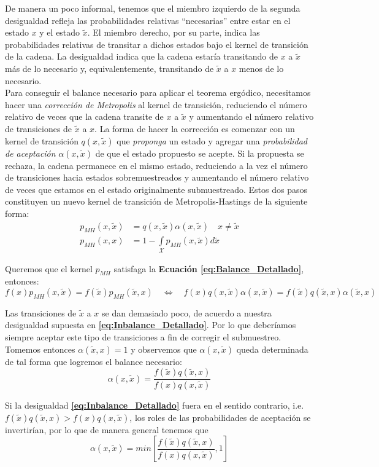 De manera un poco informal, tenemos que el miembro izquierdo de la segunda desigualdad refleja las probabilidades relativas ``necesarias'' entre estar en el estado $x$ y el estado $\tilde{x}$. El miembro derecho, por su parte, indica las probabilidades relativas de transitar a dichos estados bajo el kernel de transición de la cadena. La desigualdad indica que la cadena estaría transitando de $x$ a $\tilde{x}$ más de lo necesario y, equivalentemente, transitando de $\tilde{x}$ a $x$ menos de lo necesario.\\ 

Para conseguir el balance necesario para aplicar el teorema ergódico, necesitamos hacer una \textit{corrección de Metropolis} al kernel de transición, reduciendo el número relativo de veces que la cadena transite de $x$ a $\tilde{x}$ y aumentando el número relativo de transiciones de $\tilde{x}$ a $x$. La forma de hacer la corrección es comenzar con un kernel de transición $q(x,\tilde{x})$ que \textit{proponga} un estado y agregar una \textit{probabilidad de aceptación} $\alpha(x,\tilde{x})$ de que el estado propuesto se acepte. Si la propuesta se rechaza, la cadena permanece en el mismo estado, reduciendo a la vez el número de transiciones hacia estados sobremuestreados y aumentando el número relativo de veces que estamos en el estado originalmente submuestreado. Estos dos pasos constituyen un nuevo kernel de transición de Metropolis-Hastings de la siguiente forma: 
\begin{align*}
p_{MH}(x,\tilde{x}) &= q(x,\tilde{x})\alpha(x,\tilde{x}) \quad x \neq \tilde{x} \\
p_{MH}(x,x) &= 1 - \int\limits_\mathcal{X} p_{MH}(x,\tilde{x})d\tilde{x}
\end{align*}

Queremos que el kernel $p_{MH}$ satisfaga la \textbf{Ecuación \ref{eq:Balance_Detallado}}, entonces:
\begin{equation*}
f(x)p_{MH}(x,\tilde{x})=f(\tilde{x})p_{MH}(\tilde{x},x) \quad \Leftrightarrow \quad f(x)q(x,\tilde{x})\alpha(x,\tilde{x})=f(\tilde{x})q(\tilde{x},x)\alpha(\tilde{x},x) 
\end{equation*}

Las transiciones de $\tilde{x}$ a $x$ se dan demasiado poco, de acuerdo a nuestra desigualdad supuesta en \textbf{\ref{eq:Inbalance_Detallado}}. Por lo que deberíamos siempre aceptar este tipo de transiciones a fin de corregir el submuestreo. Tomemos entonces $\alpha(\tilde{x},x) = 1$ y observemos que $\alpha(x,\tilde{x})$ queda determinada de tal forma que logremos el balance necesario: 
\begin{equation*}
\alpha(x,\tilde{x})=\dfrac{f(\tilde{x})q(\tilde{x},x)}{f(x)q(x,\tilde{x})}
\end{equation*}

Si la desigualdad \textbf{\ref{eq:Inbalance_Detallado}} fuera en el sentido contrario, i.e. $f(\tilde{x})q(\tilde{x},x)>f(x)q(x,\tilde{x})$, los roles de las probabilidades de aceptación se invertirían, por lo que de manera general tenemos que 
\begin{equation}
\label{eq:Proba_Aceptar_MH}
\alpha(x,\tilde{x})=min\left[\dfrac{f(\tilde{x})q(\tilde{x},x)}{f(x)q(x,\tilde{x})},1\right]
\end{equation}
